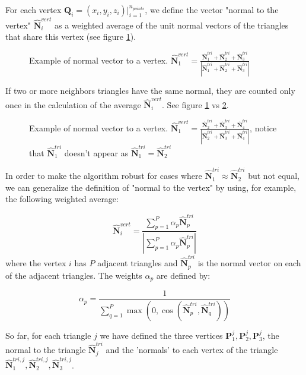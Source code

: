 \documentclass[11pt, oneside]{article}
\newcommand\bP{\boldsymbol P}
\newcommand\bN{\boldsymbol N}
\newcommand\bQ{\boldsymbol Q}
\begin{document}
For each vertex $\bQ_i=(x_i,y_i,z_i)\big|_{i=1}^{n_{points}}$, we define the vector "normal to the vertex" $\hat{\bN}_i^{vert}$ as a weighted average of the unit normal vectors of the triangles that share this vertex (see figure \ref{normalvert1}).

\begin{figure}[H]
\begin{center}
\end{center}
\caption{Example of normal vector to a vertex. $\hat{\bN}_1^{vert}=\frac{\hat{\bN}_1^{tri}+\hat{\bN}_2^{tri}+\hat{\bN}_3^{tri}}{|\hat{\bN}_1^{tri}+\hat{\bN}_2^{tri}+\hat{\bN}_3^{tri}|}$}
\label{normalvert1}
\end{figure}

If two or more neighbors triangles have the same  normal, they are counted only once in the calculation of the average $\hat{\bN}_i^{vert}$. See figure \ref{normalvert1} vs \ref{normalvert2}.

\begin{figure}[H]
\begin{center}
\end{center}
\caption{Example of normal vector to a vertex. $\hat{\bN}_1^{vert}=\frac{\hat{\bN}_2^{tri}+\hat{\bN}_3^{tri}+\hat{\bN}_4^{tri}}{|\hat{\bN}_2^{tri}+\hat{\bN}_3^{tri}+\hat{\bN}_4^{tri}|}$, notice that $\hat{\bN}_1^{tri}$ doesn't appear as $\hat{\bN}_1^{tri}=\hat{\bN}_2^{tri}$}
\label{normalvert2}
\end{figure}

In order to make the algorithm robust for cases where $\hat{\bN}_1^{tri}\approx\hat{\bN}_2^{tri}$ but not equal, we can generalize the definition of "normal to the vertex" by using, for example, the following weighted average:

\begin{equation}
\hat{\bN}_i^{vert}=\frac{\sum_{p=1}^P\alpha_p \hat{\bN}_p^{tri}}{|\sum_{p=1}^P\alpha_p \hat{\bN}_p^{tri}|}
\end{equation}
where the vertex $i$ has $P$ adjacent triangles and $\hat{\bN}_p^{tri}$ is the normal vector on each of the adjacent triangles. The weights $\alpha_p$ are defined by:

\begin{equation}
\alpha_p=\frac{1}{\sum_{q=1}^P\max(0,\cos(\hat{\bN}_p^{tri},\hat{\bN}_q^{tri}))}
\end{equation}

So far, for each triangle $j$ we have defined the three vertices $\bP_1^j,\bP_2^j,\bP_3^j$, the normal to the triangle $\hat{\bN}^{tri}_j$ and the 'normals' to each vertex of the triangle $\hat{\bN}_1^{tri,j},\hat{\bN}_2^{tri,j},\hat{\bN}_3^{tri,j}$.
\end{document}
